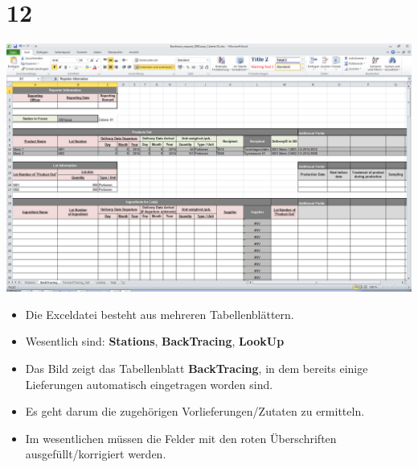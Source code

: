 \documentclass{beamer}
\begin{document}
\section{12}
\begin{frame}
	\begin{center}
  		\includegraphics[height=0.5\textheight]{12.png}
	\end{center}
	\begin{itemize}
		\item Die Exceldatei besteht aus mehreren Tabellenblättern.
		\item Wesentlich sind: \textbf{Stations}, \textbf{BackTracing}, \textbf{LookUp}
		\item Das Bild zeigt das Tabellenblatt \textbf{BackTracing}, in dem bereits einige Lieferungen automatisch eingetragen worden sind.
		\item Es geht darum die zugehörigen Vorlieferungen/Zutaten zu ermitteln.
		\item Im wesentlichen müssen die Felder mit den roten Überschriften ausgefüllt/korrigiert werden.
	\end{itemize}
\end{frame}
\end{document}

